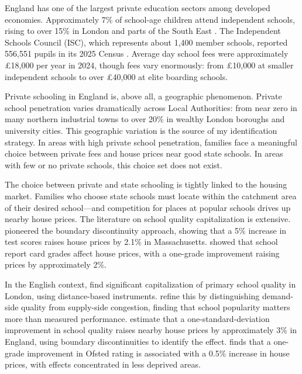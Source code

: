 \documentclass[12pt]{article}
\begin{document}
England has one of the largest private education sectors among developed economies. Approximately 7\% of school-age children attend independent schools, rising to over 15\% in London and parts of the South East \citep{isc2024}. The Independent Schools Council (ISC), which represents about 1,400 member schools, reported 556,551 pupils in its 2025 Census \citep{isc2025}. Average day school fees were approximately \pounds 18,000 per year in 2024, though fees vary enormously: from \pounds 10,000 at smaller independent schools to over \pounds 40,000 at elite boarding schools.

Private schooling in England is, above all, a geographic phenomenon. Private school penetration varies dramatically across Local Authorities: from near zero in many northern industrial towns to over 20\% in wealthy London boroughs and university cities. This geographic variation is the source of my identification strategy. In areas with high private school penetration, families face a meaningful choice between private fees and house prices near good state schools. In areas with few or no private schools, this choice set does not exist.

The choice between private and state schooling is tightly linked to the housing market. Families who choose state schools must locate within the catchment area of their desired school---and competition for places at popular schools drives up nearby house prices. The literature on school quality capitalization is extensive. \citet{black1999} pioneered the boundary discontinuity approach, showing that a 5\% increase in test scores raises house prices by 2.1\% in Massachusetts. \citet{figlio2004} showed that school report card grades affect house prices, with a one-grade improvement raising prices by approximately 2\%.

In the English context, \citet{gibbons2003} find significant capitalization of primary school quality in London, using distance-based instruments. \citet{gibbons2006} refine this by distinguishing demand-side quality from supply-side congestion, finding that school popularity matters more than measured performance. \citet{gibbons2013} estimate that a one-standard-deviation improvement in school quality raises nearby house prices by approximately 3\% in England, using boundary discontinuities to identify the effect. \citet{hussain2016} finds that a one-grade improvement in Ofsted rating is associated with a 0.5\% increase in house prices, with effects concentrated in less deprived areas.
\end{document}
